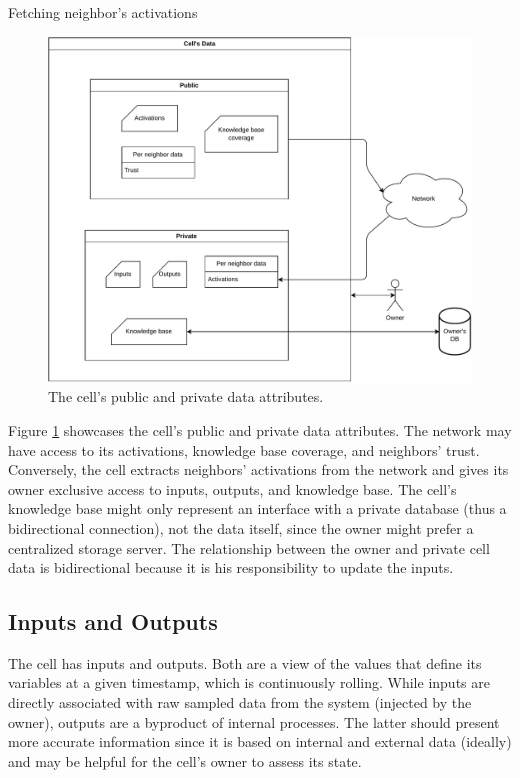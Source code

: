 Fetching neighbor's activations 

\begin{figure}[h!]
    \centering
    \includegraphics[width=\linewidth]{figures/chapter4/cell/data.pdf}
    \caption{The cell's public and private data attributes.}
    \label{fig:celldata}
\end{figure}

Figure \ref{fig:celldata} showcases the cell's public and private data attributes. The network may have access to its activations, knowledge base coverage, and neighbors' trust. Conversely, the cell extracts neighbors' activations from the network and gives its owner exclusive access to inputs, outputs, and knowledge base. The cell's knowledge base might only represent an interface with a private database (thus a bidirectional connection), not the data itself, since the owner might prefer a centralized storage server. The relationship between the owner and private cell data is bidirectional because it is his responsibility to update the inputs.



\subsection{Inputs and Outputs}

The cell has inputs and outputs. Both are a view of the values that define its variables at a given timestamp, which is continuously rolling. While inputs are directly associated with raw sampled data from the system (injected by the owner), outputs are a byproduct of internal processes. The latter should present more accurate information since it is based on internal and external data (ideally) and may be helpful for the cell's owner to assess its state.

